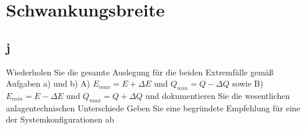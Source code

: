 \section{Schwankungsbreite}
\label{sec:Schwankungsbreite}
\subsection{j}
Wiederholen Sie die gesamte Auslegung für die beiden Extremfälle gemäß Aufgaben a) und b)
A) $E_{max} = \textit{E} + \Delta \textit{E}$ und $Q_{min} = \textit{Q} - \Delta \textit{Q}$ sowie
B) $E_{min} = \textit{E} - \Delta \textit{E}$ und $Q_{max} = \textit{Q} + \Delta \textit{Q}$
und dokumentieren Sie die wesentlichen anlagentechnischen Unterschiede
Geben Sie eine begründete Empfehlung für eine der Systemkonfigurationen ab